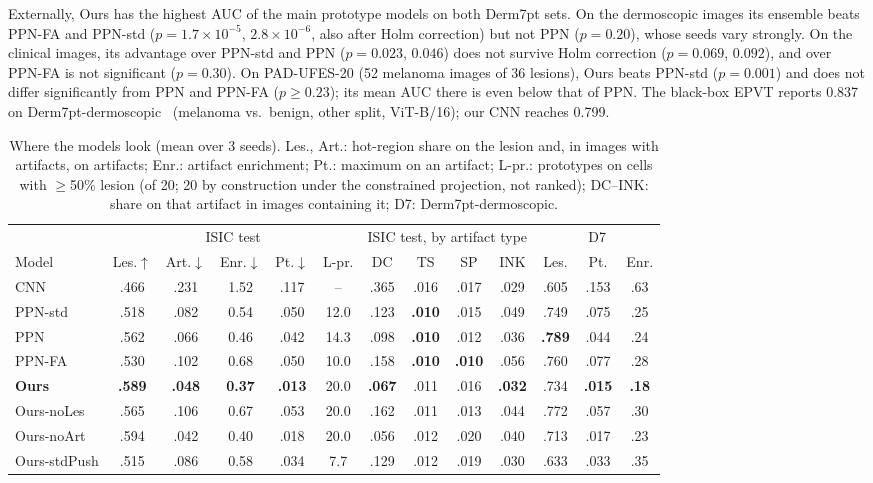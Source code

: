 \documentclass[conference]{IEEEtran}
\begin{document}
Externally, Ours has the highest AUC of the main prototype models on both Derm7pt sets. On the dermoscopic images its ensemble beats PPN-FA and PPN-std ($p=1.7\times10^{-5}$, $2.8\times10^{-6}$, also after Holm correction) but not PPN ($p=0.20$), whose seeds vary strongly. On the clinical images, its advantage over PPN-std and PPN ($p=0.023$, $0.046$) does not survive Holm correction ($p=0.069$, $0.092$), and over PPN-FA is not significant ($p=0.30$). On PAD-UFES-20 (52 melanoma images of 36 lesions), Ours beats PPN-std ($p=0.001$) and does not differ significantly from PPN and PPN-FA ($p\geq0.23$); its mean AUC there is even below that of PPN. The black-box EPVT reports 0.837 on Derm7pt-dermoscopic~\cite{yan2023} (melanoma vs.\ benign, other split, ViT-B/16); our CNN reaches 0.799.

\begin{table}[t]
\caption{Where the models look (mean over 3 seeds). Les., Art.: hot-region share on the lesion and, in images with artifacts, on artifacts; Enr.: artifact enrichment; Pt.: maximum on an artifact; L-pr.: prototypes on cells with $\geq$50\% lesion (of 20; 20 by construction under the constrained projection, not ranked); DC--INK: share on that artifact in images containing it; D7: Derm7pt-dermoscopic.}
\label{tab:attr}\label{tab:attr2}
\centering
\scriptsize
\setlength{\tabcolsep}{1.3pt}
\begin{tabular}{l|ccccc|cccc|ccc}
\toprule
& \multicolumn{5}{c|}{ISIC test} & \multicolumn{4}{c|}{ISIC test, by artifact type} & \multicolumn{3}{c}{D7} \\
Model & Les.$\uparrow$ & Art.$\downarrow$ & Enr.$\downarrow$ & Pt.$\downarrow$ & L-pr. & DC & TS & SP & INK & Les. & Pt. & Enr. \\
\midrule
CNN & .466 & .231 & 1.52 & .117 & -- & .365 & .016 & .017 & .029 & .605 & .153 & .63 \\
\midrule
PPN-std & .518 & .082 & 0.54 & .050 & 12.0 & .123 & \textbf{.010} & .015 & .049 & .749 & .075 & .25 \\
PPN & .562 & .066 & 0.46 & .042 & 14.3 & .098 & \textbf{.010} & .012 & .036 & \textbf{.789} & .044 & .24 \\
PPN-FA & .530 & .102 & 0.68 & .050 & 10.0 & .158 & \textbf{.010} & \textbf{.010} & .056 & .760 & .077 & .28 \\
\textbf{Ours} & \textbf{.589} & \textbf{.048} & \textbf{0.37} & \textbf{.013} & 20.0 & \textbf{.067} & .011 & .016 & \textbf{.032} & .734 & \textbf{.015} & \textbf{.18} \\
\midrule
Ours-noLes & .565 & .106 & 0.67 & .053 & 20.0 & .162 & .011 & .013 & .044 & .772 & .057 & .30 \\
Ours-noArt & .594 & .042 & 0.40 & .018 & 20.0 & .056 & .012 & .020 & .040 & .713 & .017 & .23 \\
Ours-stdPush & .515 & .086 & 0.58 & .034 & 7.7 & .129 & .012 & .019 & .030 & .633 & .033 & .35 \\
\bottomrule
\end{tabular}
\end{table}
\end{document}
